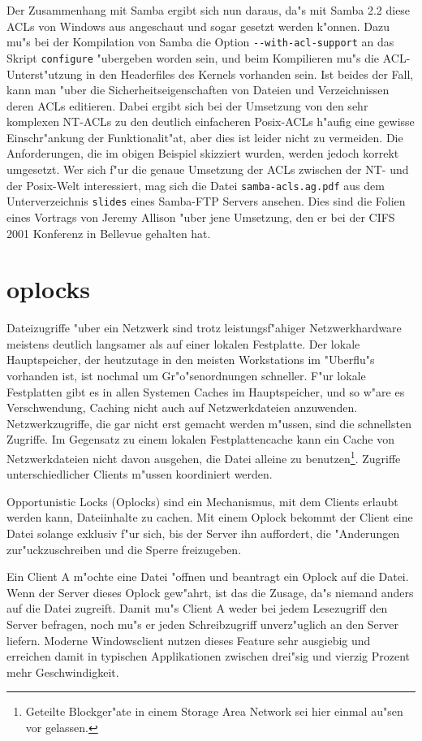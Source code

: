\documentclass{scrartcl}\usepackage{pslatex}\typearea{12}
\newcommand{\prog}{\texttt}
\newcommand{\dateistyle}{\texttt}
\begin{document}
Der Zusammenhang mit Samba ergibt sich nun daraus, da"s mit Samba 2.2
diese ACLs von Windows aus angeschaut und sogar gesetzt werden
k"onnen. Dazu mu"s bei der Kompilation von Samba die Option
\prog{-{}-with-acl-support} an das Skript \prog{configure} "ubergeben
worden sein, und beim Kompilieren mu"s die ACL-Unterst"utzung in den
Headerfiles des Kernels vorhanden sein. Ist beides der Fall, kann man
"uber die Sicherheitseigenschaften von Dateien und Verzeichnissen
deren ACLs editieren. Dabei ergibt sich bei der Umsetzung von den sehr
komplexen NT-ACLs zu den deutlich einfacheren Posix-ACLs h"aufig eine
gewisse Einschr"ankung der Funktionalit"at, aber dies ist leider nicht
zu vermeiden. Die Anforderungen, die im obigen Beispiel skizziert
wurden, werden jedoch korrekt umgesetzt. Wer sich f"ur die genaue
Umsetzung der ACLs zwischen der NT- und der Posix-Welt interessiert,
mag sich die Datei \dateistyle{samba-acls.ag.pdf} aus dem
Unterverzeichnis \prog{slides} eines Samba-FTP Servers ansehen. Dies
sind die Folien eines Vortrags von Jeremy Allison "uber jene
Umsetzung, den er bei der CIFS 2001 Konferenz in Bellevue gehalten
hat.

\section{oplocks}

Dateizugriffe "uber ein Netzwerk sind trotz leistungsf"ahiger
Netzwerkhardware meistens deutlich langsamer als auf einer lokalen
Festplatte. Der lokale Hauptspeicher, der heutzutage in den meisten
Workstations im "Uberflu"s vorhanden ist, ist nochmal um
Gr"o"senordnungen schneller. F"ur lokale Festplatten gibt es in allen
Systemen Caches im Hauptspeicher, und so w"are es Verschwendung,
Caching nicht auch auf Netzwerkdateien anzuwenden. Netzwerkzugriffe,
die gar nicht erst gemacht werden m"ussen, sind die schnellsten
Zugriffe. Im Gegensatz zu einem lokalen Festplattencache kann ein
Cache von Netzwerkdateien nicht davon ausgehen, die Datei alleine zu
benutzen\footnote{Geteilte Blockger"ate in einem Storage Area Network
  sei hier einmal au"sen vor gelassen.}. Zugriffe unterschiedlicher
Clients m"ussen koordiniert werden.

Opportunistic Locks (Oplocks) sind ein Mechanismus, mit dem Clients
erlaubt werden kann, Dateiinhalte zu cachen. Mit einem Oplock bekommt
der Client eine Datei solange exklusiv f"ur sich, bis der Server ihn
auffordert, die "Anderungen zur"uckzuschreiben und die Sperre
freizugeben.

Ein Client A m"ochte eine Datei "offnen und beantragt ein Oplock auf
die Datei. Wenn der Server dieses Oplock gew"ahrt, ist das die Zusage,
da"s niemand anders auf die Datei zugreift. Damit mu"s Client A
weder bei jedem Lesezugriff den Server befragen, noch mu"s er jeden
Schreibzugriff unverz"uglich an den Server liefern. Moderne
Windowsclient nutzen dieses Feature sehr ausgiebig und erreichen damit
in typischen Applikationen zwischen drei"sig und vierzig Prozent mehr
Geschwindigkeit.
\end{document}
